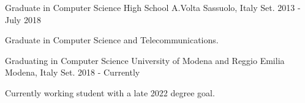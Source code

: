 

\begin{cventries}
  \cventry
    {Graduate in Computer Science} %
    {High School A.Volta} %
    {Sassuolo, Italy} %
    {Set. 2013 - July 2018} %
    {
      \begin{cvitems} %
        \item {Graduate in Computer Science and Telecommunications.}
      \end{cvitems}
    }
  \cventry
    {Graduating in Computer Science} %
    {University of Modena and Reggio Emilia} %
    {Modena, Italy} %
    {Set. 2018 - Currently} %
    {
      \begin{cvitems} %
        \item {Currently working student with a late 2022 degree goal.}
      \end{cvitems}
    }
\end{cventries}

